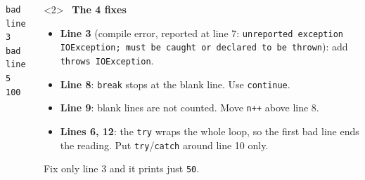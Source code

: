 \documentclass[aspectratio=169]{beamer}
\newcommand{\code}[1]{\texttt{#1}}
\newcommand{\goodlabel}[1]{\textcolor{goodgreen}{\ding{51}~\textbf{#1}}}
\begin{document}
\begin{frame}
\begin{columns}[T,onlytextwidth]
\begin{onlyenv}
\begin{lstlisting}[basicstyle=\ttfamily\fontsize{6.8}{7.9}\selectfont]
bad line 3
bad line 5
100
\end{lstlisting}
    \end{onlyenv}
    \begin{onlyenv}<2>
    \goodlabel{The 4 fixes}
    \begin{itemize}[itemsep=0.2em, leftmargin=1em]
      \footnotesize
      \item \textbf{Line 3} (compile error, reported at line 7:
            {\scriptsize\code{unreported exception IOException; must be caught or
            declared to be thrown}}): add \code{throws IOException}.
      \item \textbf{Line 8}: \code{break} stops at the blank line. Use
            \code{continue}.
      \item \textbf{Line 9}: blank lines are not counted. Move \code{n++} above
            line 8.
      \item \textbf{Lines 6, 12}: the \code{try} wraps the whole loop, so the first
            bad line ends the reading. Put \code{try}/\code{catch} around line 10
            only.
    \end{itemize}
    {\footnotesize Fix only line 3 and it prints just \code{50}.}
    \end{onlyenv}
  \end{columns}
\end{frame}
\end{document}
